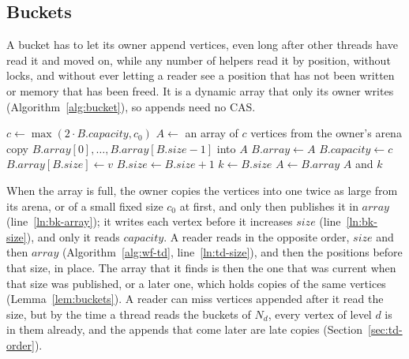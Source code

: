 \subsection{Buckets}
\label{sec:td-buckets}

A bucket has to let its owner append vertices, even long after other threads have read it and moved on, while any number of helpers read it by position, without locks, and without ever letting a reader see a position that has not been written or memory that has been freed. It is a dynamic array that only its owner writes (Algorithm~\ref{alg:bucket}), so appends need no CAS.

\begin{algorithm}
\caption{Appending to a bucket $B$, which only its owner does, and reading it, which any thread can do.}
\label{alg:bucket}
\begin{algorithmic}[1]
        \State $c \gets \max(2 \cdot B.\mathit{capacity}, c_0)$
        \State $A \gets$ an array of $c$ vertices from the owner's arena
        \State copy $B.\mathit{array}[0], \ldots, B.\mathit{array}[B.\mathit{size}-1]$ into $A$
        \State $B.\mathit{array} \gets A$ \label{ln:bk-array}
        \State $B.\mathit{capacity} \gets c$
    \EndIf
    \State $B.\mathit{array}[B.\mathit{size}] \gets v$
    \State $B.\mathit{size} \gets B.\mathit{size} + 1$ \label{ln:bk-size}
\EndProcedure
\Statex
{}
    \State $k \gets B.\mathit{size}$
    \State $A \gets B.\mathit{array}$
    \State \Return $A$ and $k$ 
\EndProcedure
\end{algorithmic}
\end{algorithm}

When the array is full, the owner copies the vertices into one twice as large from its arena, or of a small fixed size $c_0$ at first, and only then publishes it in $\mathit{array}$ (line~\ref{ln:bk-array}); it writes each vertex before it increases $\mathit{size}$ (line~\ref{ln:bk-size}), and only it reads $\mathit{capacity}$. A reader reads in the opposite order, $\mathit{size}$ and then $\mathit{array}$ (Algorithm~\ref{alg:wf-td}, line~\ref{ln:td-size}), and then the positions before that size, in place. The array that it finds is then the one that was current when that size was published, or a later one, which holds copies of the same vertices (Lemma~\ref{lem:buckets}). A reader can miss vertices appended after it read the size, but by the time a thread reads the buckets of $N_d$, every vertex of level $d$ is in them already, and the appends that come later are late copies (Section~\ref{sec:td-order}).

